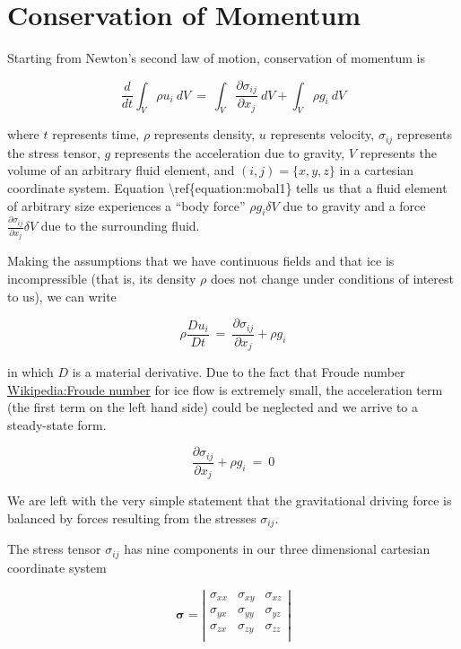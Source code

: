 \section{Conservation of Momentum}


Starting from Newton's second law of motion, conservation of momentum is

\begin{equation}
\frac{d} {dt} \int_{V}\rho u_{i}~dV ~ = ~ \int_{V} \frac{\partial \sigma_{ij}} {\partial x_{j}} ~dV +  \int_{V} \rho g_{i}~dV
\end{equation}

where $t$ represents time, $\rho$ represents density, $u$ represents
velocity, $\sigma_{ij}$ represents the stress tensor, $g$ represents the
acceleration due to gravity, $V$ represents the volume of an arbitrary
fluid element, and $(i,j)= \{x, y, z\}$ in a cartesian coordinate
system. Equation \textbackslash{}ref\{equation:mobal1\} tells us that a
fluid element of arbitrary size experiences a ``body force''
$\rho g_{i}\delta V$ due to gravity and a force
$\frac{\partial \sigma_{ij}} {\partial x_{j}} \delta V$ due to the
surrounding fluid.

Making the assumptions that we have continuous fields and that ice is
incompressible (that is, its density $\rho$ does not change under
conditions of interest to us), we can write

\begin{equation}
\rho \frac{D u_{i}}{D t}~=~\frac{\partial \sigma_{ij}}{\partial x_{j}} + \rho g_{i}
\end{equation}

in which $D$ is a material derivative. Due to the fact that Froude
number \href{Wikipedia:Froude number}{Wikipedia:Froude number} for ice
flow is extremely small, the acceleration term (the first term on the
left hand side) could be neglected and we arrive to a steady-state form.

\begin{equation}
\frac{\partial \sigma_{ij}}{\partial x_{j}} + \rho g_{i} ~=~0
\end{equation}

We are left with the very simple statement that the gravitational
driving force is balanced by forces resulting from the stresses
$\sigma_{ij}$.

The stress tensor $\sigma_{ij}$ has nine components in our three
dimensional cartesian coordinate system

\begin{equation}
\mathbf{\sigma} =
\left\vert  \begin{array}{ccc} 
    \sigma _{ xx} & \sigma _{ xy} & \sigma _{ xz} \\
    \sigma _{ yx} & \sigma _{ yy} & \sigma _{ yz} \\
    \sigma _{ zx} & \sigma _{ zy} & \sigma _{ zz} \\
\end{array} \right\vert 
\end{equation}

